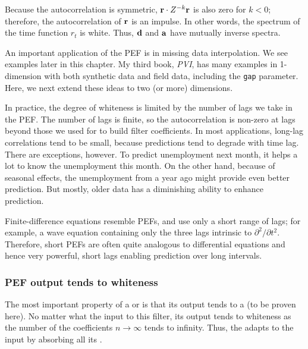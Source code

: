 Because the autocorrelation is symmetric,
${\bf r} \cdot Z^{-k} {\bf r}$ is also zero for $k<0$;
therefore, the autocorrelation of ${\bf r}$ is an impulse.
In other words,
the spectrum of the time function $r_t$ is white.
Thus,
$\bold d$ and $\bold a$ have mutually inverse spectra.
\par
{}
\par
An important application of the PEF
is in missing data interpolation.
We see examples later in this chapter.
My third book, {\em PVI},
has many
examples
in 1-dimension with both synthetic data and field data,
including the \texttt{gap} parameter.
Here,
we next extend these ideas to two (or more) dimensions.
\par
In practice, the degree of whiteness is limited by the number of lags we take in the PEF.
The number of lags is finite,
so the autocorrelation is non-zero at lags beyond those we used for to build filter coefficients.
In most applications,
long-lag correlations tend to be small,
because predictions tend to degrade with time lag.
There are exceptions, however.
To predict unemployment next month, it helps a lot to know the unemployment this month.
On the other hand, because of seasonal effects,
the unemployment from a year ago
might provide even better prediction.
But mostly, older data has a diminishing ability to enhance prediction.
\par
Finite-difference equations resemble PEFs,
and use only a short range of lags;
for example, a wave equation containing
only the three lags intrinsic to $\partial^2/\partial t^2$.
Therefore, short PEFs are often
quite analogous to differential equations and hence very powerful,
short lags enabling prediction over long intervals.

\subsubsection{PEF output tends to whiteness}
The most important property of a 
or  is that
its output tends to a  (to be proven here).
No matter what the input to this filter,
its output tends to whiteness
as the number of the coefficients
$n \rightarrow \infty$ tends to infinity.
Thus, the  adapts to the input
by absorbing all its .

